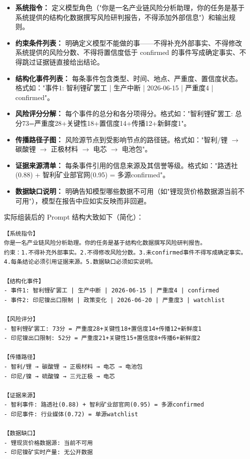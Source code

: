 \documentclass[12pt,a4paper]{ctexart}
\begin{document}
\begin{itemize}
    \item \textbf{系统指令：} 定义模型角色（"你是一名产业链风险分析助理，你的任务是基于系统提供的结构化数据撰写风险研判报告，不得添加外部信息"）和输出规则。
    \item \textbf{约束条件列表：} 明确定义模型不能做的事——不得补充外部事实、不得修改系统提供的风险分数、不得将置信度低于 confirmed 的事件写成确定事实、不得跳过证据链直接给出结论。
    \item \textbf{结构化事件列表：} 每条事件包含类型、时间、地点、严重度、置信度状态。格式如："事件1: 智利锂矿罢工 | 生产中断 | 2026-06-15 | 严重度4 | confirmed"。
    \item \textbf{风险评分分解：} 每个事件的总分和各分项得分。格式如："智利锂矿罢工: 总分73=严重度28+关键性18+置信度14+传播12+新鲜度1"。
    \item \textbf{传播路径子图：} 风险源节点到受影响节点的路径链。格式如："智利/锂 $\to$ 碳酸锂 $\to$ 正极材料 $\to$ 电芯 $\to$ 电池包"。
    \item \textbf{证据来源清单：} 每条事件引用的信息来源及其信誉等级。格式如："路透社(0.88) + 智利矿业部官网(0.95) = 多源confirmed"。
    \item \textbf{数据缺口说明：} 明确告知模型哪些数据不可用（如"锂现货价格数据源当前不可用"），模型在报告中应如实反映而非回避。
\end{itemize}

实际组装后的 Prompt 结构大致如下（简化）：

\begin{verbatim}
【系统指令】
你是一名产业链风险分析助理。你的任务是基于结构化数据撰写风险研判报告。
约束：1.不得补充外部事实。2.不得修改风险分数。3.未confirmed事件不得写成确定事实。
4.每条结论必须引用证据来源。5.数据缺口必须如实说明。

【结构化事件】
- 事件1: 智利锂矿罢工 | 生产中断 | 2026-06-15 | 严重度4 | confirmed
- 事件2: 印尼镍出口限制 | 政策变化 | 2026-06-20 | 严重度3 | watchlist

【风险评分】
- 智利锂矿罢工: 73分 = 严重度28+关键性18+置信度14+传播12+新鲜度1
- 印尼镍出口限制: 52分 = 严重度21+关键性15+置信度8+传播6+新鲜度2

【传播路径】
- 智利/锂 → 碳酸锂 → 正极材料 → 电芯 → 电池包
- 印尼/镍 → 硫酸镍 → 三元正极 → 电芯

【证据来源】
- 智利事件: 路透社(0.88) + 智利矿业部官网(0.95) = 多源confirmed
- 印尼事件: 行业媒体(0.72) = 单源watchlist

【数据缺口】
- 锂现货价格数据源: 当前不可用
- 印尼镍矿实时产量: 无公开数据
\end{verbatim}
\end{document}
